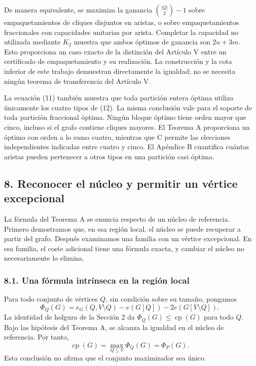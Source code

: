 \documentclass[spanish,11pt,a4paper]{article}
\begin{document}
De manera equivalente, se maximiza la ganancia \(\binom{|Q|}{2}-1\)
sobre empaquetamientos de cliques disjuntos en aristas, o sobre
empaquetamientos fraccionales con capacidades unitarias por arista.
Completar la capacidad no utilizada mediante \(K_2\) muestra que ambos
óptimos de ganancia son \(2u+3m\). Esto proporciona un caso exacto de la
distinción del Artículo V entre un certificado de empaquetamiento y su
realización. La construcción y la cota inferior de este trabajo
demuestran directamente la igualdad; no se necesita ningún teorema de
transferencia del Artículo V.

La ecuación (11) también muestra que toda partición entera óptima
utiliza únicamente los cuatro tipos de (12). La misma conclusión vale
para el soporte de toda partición fraccional óptima. Ningún bloque
óptimo tiene orden mayor que cinco, incluso si el grafo contiene cliques
mayores. El Teorema A proporciona un óptimo con orden a lo sumo cuatro,
mientras que C permite las elecciones independientes indicadas entre
cuatro y cinco. El Apéndice B cuantifica cuántas aristas pueden
pertenecer a otros tipos en una partición casi óptima.

\subsection{8. Reconocer el núcleo y permitir un vértice
excepcional}\label{reconocer-el-nuxfacleo-y-permitir-un-vuxe9rtice-excepcional}

La fórmula del Teorema A se enuncia respecto de un núcleo de referencia.
Primero demostramos que, en esa región local, el núcleo se puede
recuperar a partir del grafo. Después examinamos una familia con un
vértice excepcional. En esa familia, el coste adicional tiene una
fórmula exacta, y cambiar el núcleo no necesariamente lo elimina.

\subsubsection{8.1. Una fórmula intrínseca en la región
local}\label{una-fuxf3rmula-intruxednseca-en-la-regiuxf3n-local}

Para todo conjunto de vértices \(Q\), sin condición sobre su tamaño,
pongamos \[
\Phi_Q(G)=e_G(Q,V\setminus Q)-e(G[Q])-2e(G[V\setminus Q]).
\] La identidad de holgura de la Sección 2 da
\(\Phi_Q(G)\le\operatorname{cp}(G)\) para todo \(Q\). Bajo las hipótesis
del Teorema A, se alcanza la igualdad en el núcleo de referencia. Por
tanto, \[
\operatorname{cp}(G)=\max_{Q\subseteq V}\Phi_Q(G)=\Phi_P(G).
\] Esta conclusión no afirma que el conjunto maximizador sea único.
\end{document}
